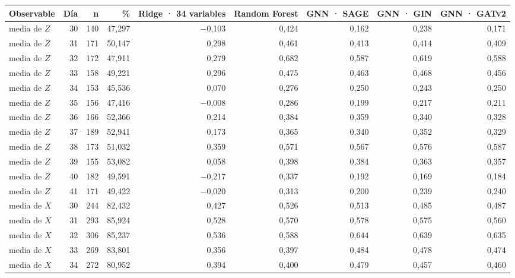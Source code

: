 \begin{table}[htbp]
    \centering
    {\footnotesize
    \begin{tabular}{@{}lrrrrrrrr@{}}
        \toprule
        \textbf{Observable} & \textbf{Día} & \textbf{n} & \textbf{\%} & \textbf{Ridge · 34 variables} & \textbf{Random Forest} & \textbf{GNN · SAGE} & \textbf{GNN · GIN} & \textbf{GNN · GATv2} \\
        \midrule
        media de $Z$ & 30 & 140 & 47,297 & $-$0,103 & 0,424 & 0,162 & 0,238 & 0,171 \\
        media de $Z$ & 31 & 171 & 50,147 & 0,298 & 0,461 & 0,413 & 0,414 & 0,409 \\
        media de $Z$ & 32 & 172 & 47,911 & 0,279 & 0,682 & 0,587 & 0,619 & 0,588 \\
        media de $Z$ & 33 & 158 & 49,221 & 0,296 & 0,475 & 0,463 & 0,468 & 0,456 \\
        media de $Z$ & 34 & 153 & 45,536 & 0,070 & 0,276 & 0,250 & 0,243 & 0,250 \\
        media de $Z$ & 35 & 156 & 47,416 & $-$0,008 & 0,286 & 0,199 & 0,217 & 0,211 \\
        media de $Z$ & 36 & 166 & 52,366 & 0,214 & 0,384 & 0,359 & 0,340 & 0,328 \\
        media de $Z$ & 37 & 189 & 52,941 & 0,173 & 0,365 & 0,340 & 0,352 & 0,329 \\
        media de $Z$ & 38 & 173 & 51,032 & 0,359 & 0,571 & 0,567 & 0,576 & 0,587 \\
        media de $Z$ & 39 & 155 & 53,082 & 0,058 & 0,398 & 0,384 & 0,363 & 0,357 \\
        media de $Z$ & 40 & 182 & 49,591 & $-$0,217 & 0,337 & 0,192 & 0,169 & 0,184 \\
        media de $Z$ & 41 & 171 & 49,422 & $-$0,020 & 0,313 & 0,200 & 0,239 & 0,240 \\
        media de $X$ & 30 & 244 & 82,432 & 0,427 & 0,526 & 0,513 & 0,485 & 0,487 \\
        media de $X$ & 31 & 293 & 85,924 & 0,528 & 0,570 & 0,578 & 0,575 & 0,560 \\
        media de $X$ & 32 & 306 & 85,237 & 0,536 & 0,588 & 0,644 & 0,639 & 0,635 \\
        media de $X$ & 33 & 269 & 83,801 & 0,356 & 0,397 & 0,484 & 0,478 & 0,474 \\
        media de $X$ & 34 & 272 & 80,952 & 0,394 & 0,400 & 0,479 & 0,457 & 0,460 \\

\end{tabular}}
\end{table}
